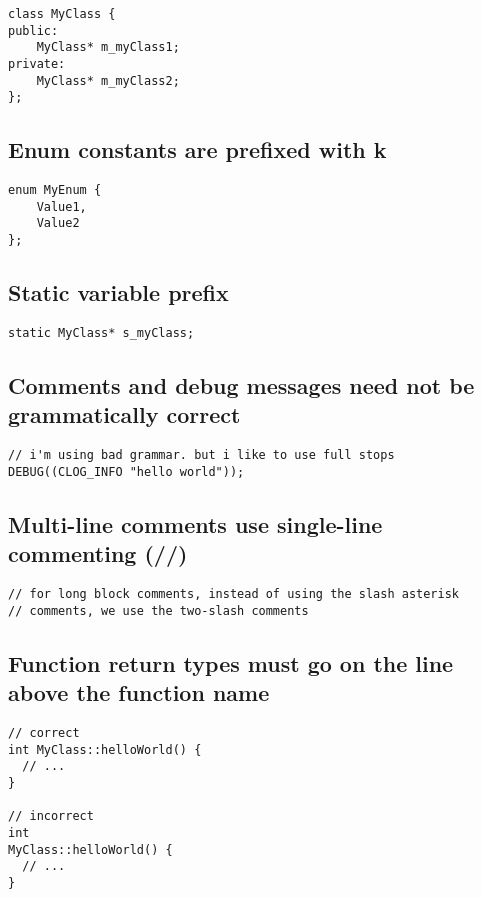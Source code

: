 \begin{verbatim}
class MyClass {
public:
    MyClass* m_myClass1;
private:
    MyClass* m_myClass2;
};
\end{verbatim}

\subsection{Enum constants are prefixed with k}

\begin{verbatim}
enum MyEnum {
    Value1,
    Value2
};
\end{verbatim}

\subsection{Static variable prefix}

\begin{verbatim}
static MyClass* s_myClass;
\end{verbatim}

\subsection{Comments and debug messages need not be grammatically correct}

\begin{verbatim}
// i'm using bad grammar. but i like to use full stops
DEBUG((CLOG_INFO "hello world"));
\end{verbatim}

\subsection{Multi-line comments use single-line commenting (//)}

\begin{verbatim}
// for long block comments, instead of using the slash asterisk
// comments, we use the two-slash comments
\end{verbatim}

\subsection{Function return types must go on the line above the function name}

\begin{verbatim}
// correct
int MyClass::helloWorld() {
  // ...
}

// incorrect
int
MyClass::helloWorld() {
  // ...
}
\end{verbatim}

